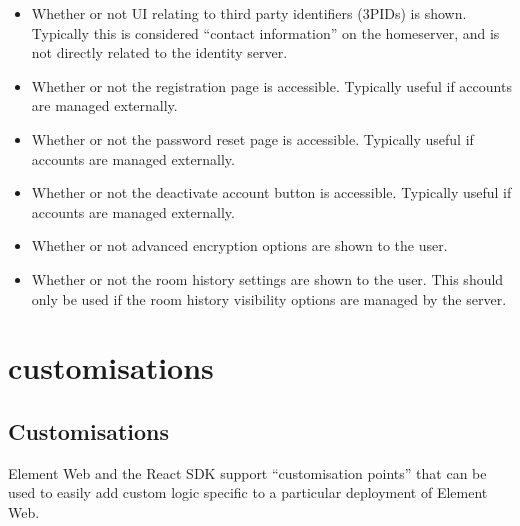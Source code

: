 \documentclass[letterpaper,10pt,openany,oneside,english]{sphinxmanual}
\begin{document}
\begin{itemize}
\item {} 
\sphinxAtStartPar
{} \sphinxhyphen{} Whether or not UI relating to third party identifiers (3PIDs)
is shown. Typically this is considered “contact information” on the homeserver, and is
not directly related to the identity server.

\item {} 
\sphinxAtStartPar
{} \sphinxhyphen{} Whether or not the registration page is accessible. Typically
useful if accounts are managed externally.

\item {} 
\sphinxAtStartPar
{} \sphinxhyphen{} Whether or not the password reset page is accessible. Typically
useful if accounts are managed externally.

\item {} 
\sphinxAtStartPar
{} \sphinxhyphen{} Whether or not the deactivate account button is accessible. Typically
useful if accounts are managed externally.

\item {} 
\sphinxAtStartPar
{} \sphinxhyphen{} Whether or not advanced encryption options are shown to the
user.

\item {} 
\sphinxAtStartPar
{} \sphinxhyphen{} Whether or not the room history settings are shown to the user.
This should only be used if the room history visibility options are managed by the server.

\end{itemize}


\chapter{customisations}
\label{\detokenize{customisations:customisations}}\label{\detokenize{customisations::doc}}

\section{Customisations}
\label{\detokenize{customisations:id1}}
\sphinxAtStartPar
Element Web and the React SDK support “customisation points” that can be used to
easily add custom logic specific to a particular deployment of Element Web.
\end{document}
